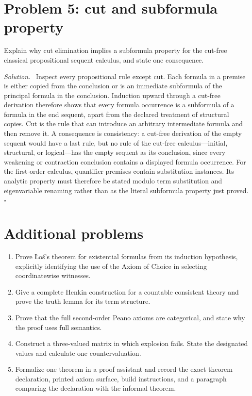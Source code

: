 \documentclass[11pt,oneside,openany]{book}
\theoremstyle{definition}
\theoremstyle{plain}
\theoremstyle{remark}
\newenvironment{solution}{\par\noindent\textit{Solution.}\ }{\hfill$\square$\par}
\begin{document}
\section{Problem 5: cut and subformula property}
\label{sec:qualifying-problems-05}
\label{prob:cut-subformula}

Explain why cut elimination implies a subformula property for the cut-free
classical propositional sequent calculus, and state one consequence.

\begin{solution}
Inspect every propositional rule except cut.  Each formula in a premise is either copied from
the conclusion or is an immediate subformula of the principal formula in the
conclusion.  Induction upward through a cut-free derivation therefore shows
that every formula occurrence is a subformula of a formula in the end sequent,
apart from the declared treatment of structural copies.  Cut is the rule that
can introduce an arbitrary intermediate formula and then remove it.  A
consequence is consistency: a cut-free derivation of the empty sequent
would have a last rule, but no rule of the cut-free calculus---initial,
structural, or logical---has the empty sequent as its conclusion, since
every weakening or contraction conclusion contains a displayed formula
occurrence.
For the first-order calculus, quantifier premises contain substitution
instances.  Its analytic property must therefore be stated modulo term
substitution and eigenvariable renaming rather than as the literal subformula
property just proved.
\end{solution}

\section{Additional problems}
\label{sec:qualifying-problems-06}

\begin{enumerate}
  \item Prove \L{}o\'s's theorem for existential formulas from its induction
        hypothesis, explicitly identifying the use of the Axiom of Choice in
        selecting coordinatewise witnesses.
  \item Give a complete Henkin construction for a countable consistent theory
        and prove the truth lemma for its term structure.
  \item Prove that the full second-order Peano axioms are categorical, and state
        why the proof uses full semantics.
  \item Construct a three-valued matrix in which explosion fails.  State the
        designated values and calculate one countervaluation.
  \item Formalize one theorem in a proof assistant and record the exact theorem
        declaration, printed axiom surface, build instructions, and a paragraph
        comparing the declaration with the informal theorem.
\end{enumerate}
\end{document}
